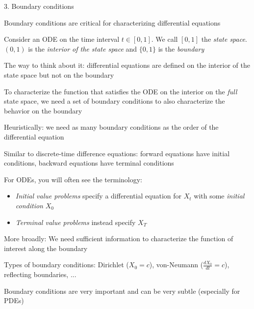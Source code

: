 \documentclass[11pt, aspectratio=169]{beamer}
\newenvironment{witemize}{\itemize\addtolength{\itemsep}{10pt}}{\enditemize}
\begin{document}
\begin{frame}{3. Boundary conditions}
\begin{witemize}
\item Boundary conditions are critical for characterizing differential equations

\item Consider an ODE on the time interval $t \in [0, 1]$. We call $[0, 1]$ the \textit{state space}. $(0, 1)$ is the \textit{interior of the state space} and $\{0, 1\}$ is the \textit{boundary}

\item The way to think about it: differential equations are defined on the interior of the state space but not on the boundary

\item To characterize the function that satisfies the ODE on the interior on the \textit{full} state space, we need a set of boundary conditions to also characterize the behavior on the boundary

\item Heuristically: we need as many boundary conditions as the order of the differential equation
\end{witemize}
\end{frame}


\begin{frame}{}
\begin{witemize}
\item Similar to discrete-time difference equations: forward equations have initial conditions, backward equations have terminal conditions

\item For ODEs, you will often see the terminology:
\begin{itemize}
	\item \textit{Initial value problems} specify a differential equation for $X_t$ with some \textit{initial condition} $X_0$
	
	\item \textit{Terminal value problems} instead specify $X_T$
\end{itemize}

\item More broadly: We need sufficient information to characterize the function of interest along the boundary

\item Types of boundary conditions: Dirichlet ($X_0 = c$), von-Neumann ($\frac{dX_0}{dt} = c$), reflecting boundaries, ...

\item Boundary conditions are very important and can be very subtle (especially for PDEs)
\end{witemize}
\end{frame}
\end{document}
